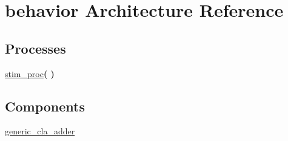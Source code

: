 \hypertarget{classtb__generic__cla__adder_1_1behavior}{}\section{behavior Architecture Reference}
\label{classtb__generic__cla__adder_1_1behavior}
\subsection*{Processes}
 \begin{DoxyCompactItemize}
\item 
\hyperlink{classtb__generic__cla__adder_1_1behavior_ad2efa6785cff833c341e27596b21aeb5}{stim\+\_\+proc}{\bfseries  (  )}
\end{DoxyCompactItemize}
\subsection*{Components}
 \begin{DoxyCompactItemize}
\item 
\hyperlink{classtb__generic__cla__adder_1_1behavior_ae7148956d4ef1d1cd14f35060634b9c3}{generic\+\_\+cla\+\_\+adder}  {\bfseries }  
\end{DoxyCompactItemize}
